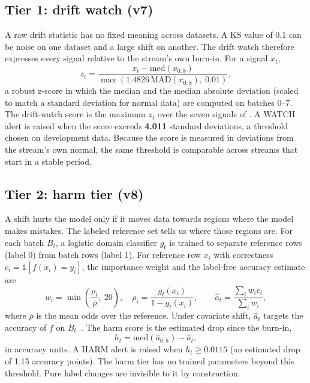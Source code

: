 \subsection{Tier 1: drift watch (v7)}
A raw drift statistic has no fixed meaning across datasets. A KS value of 0.1 can be noise on one dataset and a large shift on another. The drift watch therefore expresses every signal relative to the stream's own burn-in. For a signal $x_t$,
\begin{equation}
z_t = \frac{x_t - \mathrm{med}(x_{0:8})}{\max\left(1.4826\,\mathrm{MAD}(x_{0:8}),\ 0.01\right)},
\end{equation}
a robust z-score in which the median and the median absolute deviation (scaled to match a standard deviation for normal data) are computed on batches 0--7. The drift-watch score is the maximum $z_t$ over the seven signals of . A WATCH alert is raised when the score exceeds \textbf{4.011} standard deviations, a threshold chosen on development data. Because the score is measured in deviations from the stream's own normal, the same threshold is comparable across streams that start in a stable period.

\subsection{Tier 2: harm tier (v8)}
\label{sec:harm}
A shift hurts the model only if it moves data towards regions where the model makes mistakes. The labeled reference set tells us where those regions are. For each batch $B_t$, a logistic domain classifier $g_t$ is trained to separate reference rows (label 0) from batch rows (label 1). For reference row $x_i$ with correctness $c_i = \mathbb{1}[f(x_i)=y_i]$, the importance weight and the label-free accuracy estimate are
\begin{equation}
w_i = \min\!\left(\frac{\rho_i}{\bar\rho},\ 20\right),\quad \rho_i=\frac{g_t(x_i)}{1-g_t(x_i)},\qquad \hat a_t = \frac{\sum_i w_i c_i}{\sum_i w_i},
\label{eq:iw}
\end{equation}
where $\bar\rho$ is the mean odds over the reference. Under covariate shift, $\hat a_t$ targets the accuracy of $f$ on $B_t$~\cite{shimodaira2000,sugiyama2007iwcv}. The harm score is the estimated drop since the burn-in,
\begin{equation}
h_t = \mathrm{med}(\hat a_{0:8}) - \hat a_t,
\end{equation}
in accuracy units. A HARM alert is raised when $h_t \ge 0.0115$ (an estimated drop of 1.15 accuracy points). The harm tier has no trained parameters beyond this threshold. Pure label changes are invisible to it by construction.

